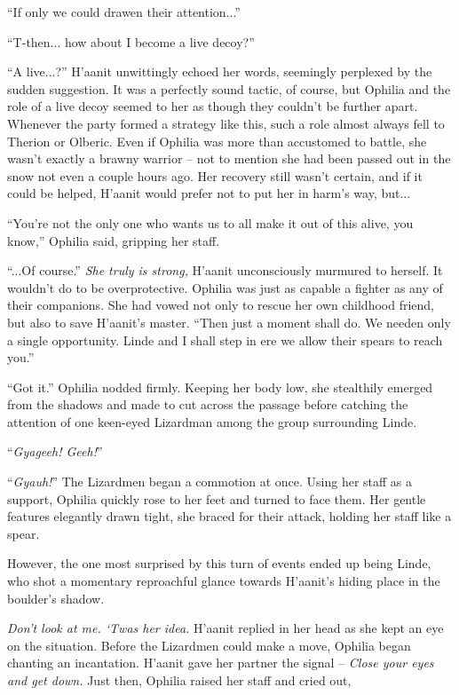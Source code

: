 ``If only we could drawen their attention...''

``T-then... how about I become a live decoy?''

``A live...?'' H'aanit unwittingly echoed her words, seemingly perplexed by the sudden suggestion. It was a perfectly sound tactic, of course, but Ophilia and the role of a live decoy seemed to her as though they couldn't be further apart. Whenever the party formed a strategy like this, such a role almost always fell to Therion or Olberic. Even if Ophilia was more than accustomed to battle, she wasn't exactly a brawny warrior -- not to mention she had been passed out in the snow not even a couple hours ago. Her recovery still wasn't certain, and if it could be helped, H'aanit would prefer not to put her in harm's way, but...

``You're not the only one who wants us to all make it out of this alive, you know,'' Ophilia said, gripping her staff.

``...Of course.'' \emph{She truly is strong,} H'aanit unconsciously murmured to herself. It wouldn't do to be overprotective. Ophilia was just as capable a fighter as any of their companions. She had vowed not only to rescue her own childhood friend, but also to save H'aanit's master. ``Then just a moment shall do. We needen only a single opportunity. Linde and I shall step in ere we allow their spears to reach you.''

``Got it.'' Ophilia nodded firmly. Keeping her body low, she stealthily emerged from the shadows and made to cut across the passage before catching the attention of one keen-eyed Lizardman among the group surrounding Linde.

``\emph{Gyageeh! Geeh!}''

``\emph{Gyauh!}'' The Lizardmen began a commotion at once. Using her staff as a support, Ophilia quickly rose to her feet and turned to face them. Her gentle features elegantly drawn tight, she braced for their attack, holding her staff like a spear.

However, the one most surprised by this turn of events ended up being Linde, who shot a momentary reproachful glance towards H'aanit's hiding place in the boulder's shadow. 

\emph{Don't look at me. `Twas her idea.} H'aanit replied in her head as she kept an eye on the situation. Before the Lizardmen could make a move, Ophilia began chanting an incantation. H'aanit gave her partner the signal -- \emph{Close your eyes and get down.} Just then, Ophilia raised her staff and cried out,

